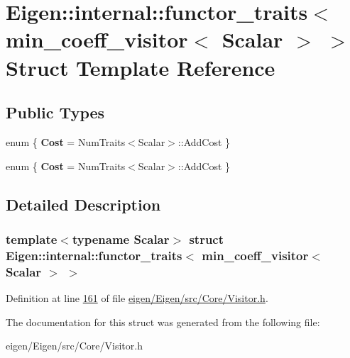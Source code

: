 \hypertarget{struct_eigen_1_1internal_1_1functor__traits_3_01min__coeff__visitor_3_01_scalar_01_4_01_4}{}\section{Eigen\+:\+:internal\+:\+:functor\+\_\+traits$<$ min\+\_\+coeff\+\_\+visitor$<$ Scalar $>$ $>$ Struct Template Reference}
\label{struct_eigen_1_1internal_1_1functor__traits_3_01min__coeff__visitor_3_01_scalar_01_4_01_4}
\subsection*{Public Types}
\begin{DoxyCompactItemize}
\item 
\mbox{\label{struct_eigen_1_1internal_1_1functor__traits_3_01min__coeff__visitor_3_01_scalar_01_4_01_4_a96937cd88333ed636b1f6c2f755a3575}} 
enum \{ {\bfseries Cost} = Num\+Traits$<$Scalar$>$\+:\+:Add\+Cost
 \}
\item 
\mbox{\label{struct_eigen_1_1internal_1_1functor__traits_3_01min__coeff__visitor_3_01_scalar_01_4_01_4_adda5400ad2aa38f0ae49c1b44cf07d1d}} 
enum \{ {\bfseries Cost} = Num\+Traits$<$Scalar$>$\+:\+:Add\+Cost
 \}
\end{DoxyCompactItemize}


\subsection{Detailed Description}
\subsubsection*{template$<$typename Scalar$>$\newline
struct Eigen\+::internal\+::functor\+\_\+traits$<$ min\+\_\+coeff\+\_\+visitor$<$ Scalar $>$ $>$}



Definition at line \hyperlink{eigen_2_eigen_2src_2_core_2_visitor_8h_source_l00161}{161} of file \hyperlink{eigen_2_eigen_2src_2_core_2_visitor_8h_source}{eigen/\+Eigen/src/\+Core/\+Visitor.\+h}.



The documentation for this struct was generated from the following file\+:\begin{DoxyCompactItemize}
\item 
eigen/\+Eigen/src/\+Core/\+Visitor.\+h\end{DoxyCompactItemize}
